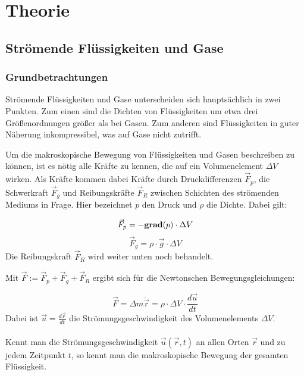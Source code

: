 \section{Theorie}
\subsection{Strömende Flüssigkeiten und Gase}



\subsubsection{Grundbetrachtungen}
Strömende Flüssigkeiten und Gase unterscheiden sich hauptsächlich in zwei Punkten. Zum einen sind die Dichten von Flüssigkeiten um etwa drei Größenordnungen größer als bei Gasen. Zum anderen sind Flüssigkeiten in guter Näherung inkompressibel, was auf Gase nicht zutrifft.

Um die makroskopische Bewegung von Flüssigkeiten und Gasen beschreiben zu können, ist es nötig alle Kräfte zu kennen, die auf ein Volumenelement $ \Delta V $ wirken. Als Kräfte kommen dabei Kräfte durch Druckdifferenzen $ \vec{F}_p $, die Schwerkraft $ \vec{F}_g $ und Reibungskräfte $ \vec{F}_R $ zwischen Schichten des strömenden Mediums in Frage. Hier bezeichnet $p$ den Druck und $\rho$ die Dichte. Dabei gilt:

\begin{equation}
\vec{F}_p = -{\bf grad}(p) \cdot \Delta V
\end{equation}
\begin{equation}
\vec{F}_g = \rho \cdot \vec{g} \cdot \Delta V
\end{equation}
Die Reibungskraft $ \vec{F}_R $ wird weiter unten noch behandelt.

Mit $ \vec{F} := \vec{F}_p + \vec{F}_g + \vec{F}_R $ ergibt sich für die Newtonschen Bewegungsgleichungen:

\begin{equation}
\vec{F} = \Delta m \ddot{\vec{r}} = \rho \cdot \Delta V \cdot \frac{d \vec{u}}{dt}
\label{form:Newton}
\end{equation}
Dabei ist $ \vec{u} = \frac{d \vec{r}}{dt} $ die Strömungsgeschwindigkeit des Volumenelements $ \Delta V $.\\
\\Kennt man die Strömungsgeschwindigkeit $ \vec{u} ( \vec{r} , t) $ an allen Orten $ \vec{r} $ und zu jedem Zeitpunkt $ t $, so kennt man die makroskopische Bewegung der gesamten Flüssigkeit.

